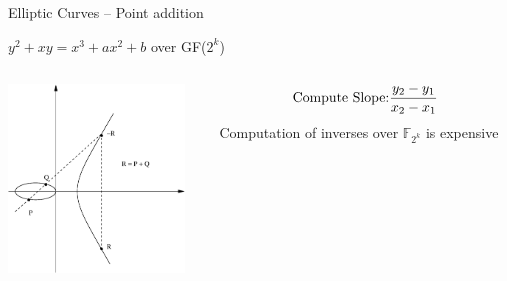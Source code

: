 \documentclass[xcolor=dvipsnames]{beamer}
\newcommand{\Fkk}{{\mathbb{F}}_{2^k}}
\begin{document}
\begin{frame}{{Elliptic Curves -- Point addition}}


\begin{center}
$y^2 + xy = x^3 + ax^2 + b$ over GF($2^k$)
\end{center}

\begin{columns}

\begin{column}{0.3\textwidth}
\begin{center}
\includegraphics[height=50mm]{ecc.eps}
\end{center}
\end{column}

\begin{column}{0.3\textwidth}
$$\text{Compute Slope:} {y_2 - y_1 \over x_2 - x_1}$$
Computation of inverses over $\Fkk$ is expensive
\end{column}

\end{columns}
\end{frame}




\end{document}
